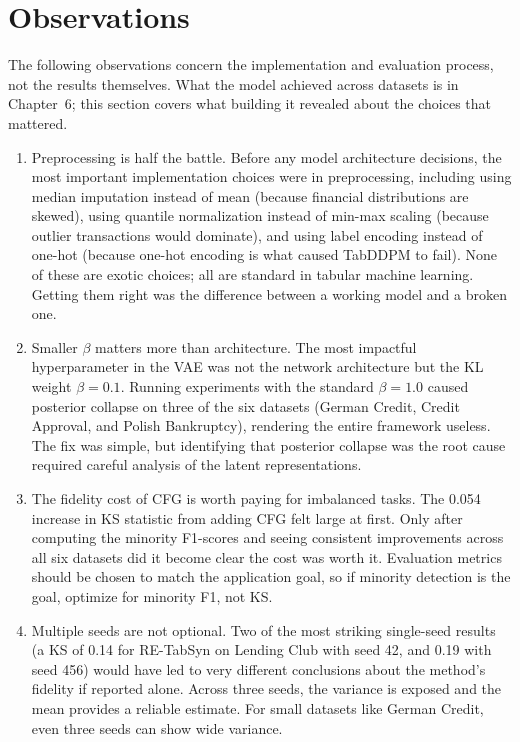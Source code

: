 \section{Observations}

The following observations concern the implementation and evaluation process, not the results themselves. What the model achieved across datasets is in Chapter~6; this section covers what building it revealed about the choices that mattered.

\begin{enumerate}
    \item Preprocessing is half the battle. Before any model architecture decisions, the most important implementation choices were in preprocessing, including using median imputation instead of mean (because financial distributions are skewed), using quantile normalization instead of min-max scaling (because outlier transactions would dominate), and using label encoding instead of one-hot (because one-hot encoding is what caused TabDDPM to fail). None of these are exotic choices; all are standard in tabular machine learning. Getting them right was the difference between a working model and a broken one.

    \item Smaller $\beta$ matters more than architecture. The most impactful hyperparameter in the VAE was not the network architecture but the KL weight $\beta = 0.1$. Running experiments with the standard $\beta = 1.0$ caused posterior collapse on three of the six datasets (German Credit, Credit Approval, and Polish Bankruptcy), rendering the entire framework useless. The fix was simple, but identifying that posterior collapse was the root cause required careful analysis of the latent representations.

    \item The fidelity cost of CFG is worth paying for imbalanced tasks. The 0.054 increase in KS statistic from adding CFG felt large at first. Only after computing the minority F1-scores and seeing consistent improvements across all six datasets did it become clear the cost was worth it. Evaluation metrics should be chosen to match the application goal, so if minority detection is the goal, optimize for minority F1, not KS.

    \item Multiple seeds are not optional. Two of the most striking single-seed results (a KS of 0.14 for RE-TabSyn on Lending Club with seed 42, and 0.19 with seed 456) would have led to very different conclusions about the method's fidelity if reported alone. Across three seeds, the variance is exposed and the mean provides a reliable estimate. For small datasets like German Credit, even three seeds can show wide variance.


\end{enumerate}
